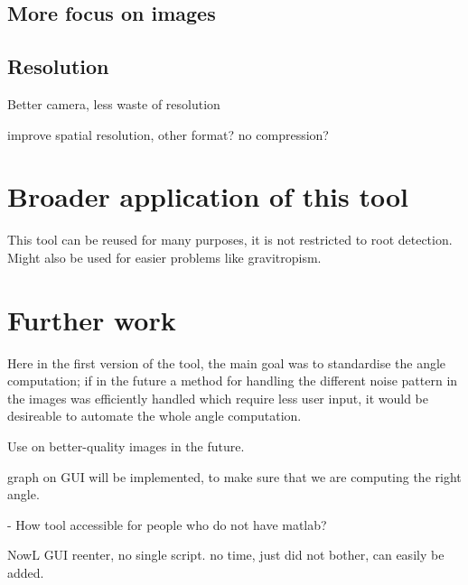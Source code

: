 \subsection{More focus on images}


\subsection{Resolution}

Better camera, less waste of resolution

improve spatial resolution, other format? no compression?
 
 
\section{Broader application of this tool}

This tool can be reused for many purposes, it is not restricted to root detection.
Might also be used for easier problems like gravitropism.


\section{Further work}

Here in the first version of the tool, the main goal was to standardise the angle computation; if in the future  a method for handling the different noise pattern in the images was efficiently handled which require less user input, it would be desireable to automate the whole angle computation.

Use on better-quality images in the future.


graph on GUI will be implemented, to make sure that we are computing the right angle.


- How tool accessible for people who do not have matlab?

NowL GUI reenter, no single script. no time, just did not bother, can easily be added.



